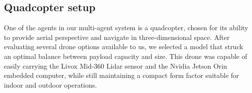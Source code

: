 \documentclass[11pt]{article}
\begin{document}
            \begin{figure}[H]
                \centering 
            \end{figure}



        \subsection{Quadcopter setup}
                

                One of the agents in our multi-agent system is a quadcopter, chosen for its ability to provide aerial perspective and navigate in three-dimensional space. After evaluating several drone options available to us, we selected a model that struck an optimal balance between payload capacity and size. This drone was capable of easily carrying the Livox Mid-360 Lidar sensor and the Nvidia Jetson Orin embedded computer, while still maintaining a compact form factor suitable for indoor and outdoor operations.
\end{document}
